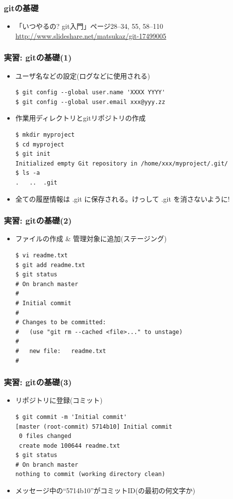 \begin{frame}
  \frametitle{gitの基礎}
  \begin{itemize}
  \item 「いつやるの? git入門」ページ28--34, 55, 58--110 \\
    \url{http://www.slideshare.net/matsukaz/git-17499005}
  \end{itemize}
\end{frame}

\begin{frame}[t,fragile]
  \frametitle{実習: gitの基礎(1)}
  \begin{itemize}
  \item ユーザ名などの設定(ログなどに使用される)
\begin{lstlisting}
$ git config --global user.name 'XXXX YYYY'
$ git config --global user.email xxx@yyy.zz
\end{lstlisting}
  \item 作業用ディレクトリとgitリポジトリの作成
\begin{lstlisting}
$ mkdir myproject
$ cd myproject
$ git init
Initialized empty Git repository in /home/xxx/myproject/.git/
$ ls -a
.	..	.git
\end{lstlisting}
  \item 全ての履歴情報は .git に保存される。けっして .git を消さないように!
  \end{itemize}
\end{frame}

\begin{frame}[t,fragile]
  \frametitle{実習: gitの基礎(2)}
  \begin{itemize}
  \item ファイルの作成 \& 管理対象に追加(ステージング)
\begin{lstlisting}
$ vi readme.txt
$ git add readme.txt
$ git status
# On branch master
#
# Initial commit
#
# Changes to be committed:
#   (use "git rm --cached <file>..." to unstage)
#
#	new file:   readme.txt
#
\end{lstlisting}
  \end{itemize}
\end{frame}

\begin{frame}[t,fragile]
  \frametitle{実習: gitの基礎(3)}
  \begin{itemize}
  \item リポジトリに登録(コミット)
\begin{lstlisting}
$ git commit -m 'Initial commit'
[master (root-commit) 5714b10] Initial commit
 0 files changed
 create mode 100644 readme.txt
$ git status
# On branch master
nothing to commit (working directory clean)
\end{lstlisting}
  \item メッセージ中の``5714b10''がコミットID(の最初の何文字か)
  \end{itemize}
\end{frame}

